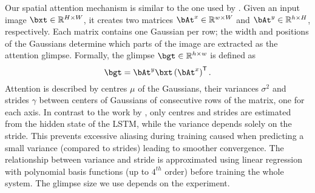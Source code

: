   \begin{description}[leftmargin=\parindent]
  \item[Spatial Attention]

	Our spatial attention mechanism is similar to the one used by \citet{Kahou2015ratm}. Given an input image $\bxt \in \RR^{H \times W}$, it creates two matrices $\bAt^x \in \RR^{w \times W}$ and $\bAt^y \in \RR^{h \times H}$, respectively. Each matrix contains one Gaussian per row; the width and positions of the Gaussians determine which parts of the image are extracted as the attention glimpse. Formally, the glimpse $\bgt \in \RR^{h \times w}$ is defined as
	\begin{equation}
		\bgt = \bAt^y \bxt \left( \bAt^x \right)^{\mathsf{T}}.
	\end{equation} 
	Attention is described by centres $\mu$ of the Gaussians, their variances $\sigma^2$ and strides $\gamma$ between centers of Gaussians of consecutive rows of the matrix, one for each axis. In contrast to the work by \citet{Kahou2015ratm}, only centres and strides are estimated from the hidden state of the LSTM, while the variance depends solely on the stride. This prevents excessive aliasing during training caused when predicting a small variance (compared to strides) leading to smoother convergence. The relationship between variance and stride is approximated using linear regression with polynomial basis functions (up to $4^{th}$ order) before training the whole system. The glimpse size we use depends on the experiment.
	
  \item[Appearance Attention]


\end{description}
